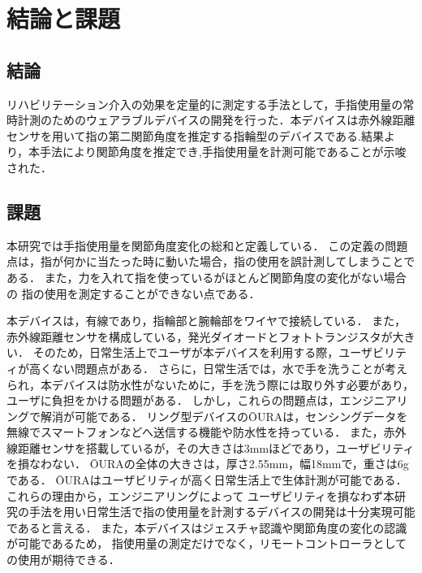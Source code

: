 \chapter{結論と課題}

\section{結論}
リハビリテーション介入の効果を定量的に測定する手法として，手指使用量の常時計測のためのウェアラブルデバイスの開発を行った．本デバイスは赤外線距離センサを用いて指の第二関節角度を推定する指輪型のデバイスである.結果より，本手法により関節角度を推定でき,手指使用量を計測可能であることが示唆された．



\section{課題}
本研究では手指使用量を関節角度変化の総和と定義している．
この定義の問題点は，指が何かに当たった時に動いた場合，指の使用を誤計測してしまうことである．
また，力を入れて指を使っているがほとんど関節角度の変化がない場合の
指の使用を測定することができない点である．

本デバイスは，有線であり，指輪部と腕輪部をワイヤで接続している．
また，赤外線距離センサを構成している，発光ダイオードとフォトトランジスタが大きい．
そのため，日常生活上でユーザが本デバイスを利用する際，ユーザビリティが高くない問題点がある．
さらに，日常生活では，水で手を洗うことが考えられ，本デバイスは防水性がないために，手を洗う際には取り外す必要があり，ユーザに負担をかける問題がある．
しかし，これらの問題点は，エンジニアリングで解消が可能である．
リング型デバイスのŌURA\cite{DeZambotti2017}は，センシングデータを無線でスマートフォンなどへ送信する機能や防水性を持っている．
また，赤外線距離センサを搭載しているが，その大きさは3mmほどであり，ユーザビリティを損なわない．
ŌURAの全体の大きさは，厚さ2.55mm，幅18mmで，重さは6gである．
ŌURAはユーザビリティが高く日常生活上で生体計測が可能である．
これらの理由から，エンジニアリングによって
ユーザビリティを損なわず本研究の手法を用い日常生活で指の使用量を計測するデバイスの開発は十分実現可能であると言える．
また，本デバイスはジェスチャ認識や関節角度の変化の認識が可能であるため，
指使用量の測定だけでなく，リモートコントローラとしての使用が期待できる．






